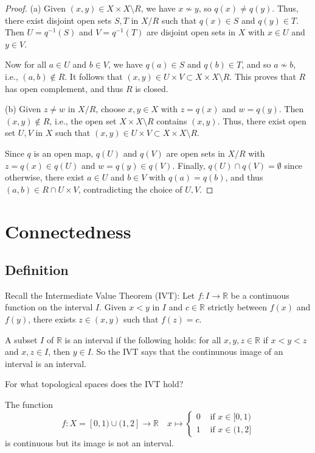 \documentclass[a4paper,11pt]{article}
\begin{document}
\begin{proof}
    (a) Given $(x, y) \in X \times X \setminus R$, we have $x \not\sim y$, so $q(x) \neq q(y)$. Thus, there exist disjoint open sets $S, T$ in $X / R$ such that $q(x) \in S$ and $q(y) \in T$. Then $U=q^{-1}(S)$ and $V=q^{-1}(T)$ are disjoint open sets in $X$ with $x \in U$ and $y \in V$. 
    
    Now for all $a \in U$ and $b \in V$, we have $q(a) \in S$ and $q(b) \in T$, and so $a \not\sim b$, i.e., $(a, b) \notin R$. It follows that $(x, y) \in U \times V \subset X \times X \setminus R$. This proves that $R$ has open complement, and thus $R$ is closed.

(b) Given $z \neq w$ in $X / R$, choose $x, y \in X$ with $z=q(x)$ and $w=q(y)$. Then $(x, y) \notin R$, i.e., the open set $X \times X \setminus R$ contains $(x, y)$. Thus, there exist open set $U, V$ in $X$ such that $(x, y) \in U \times V \subset X \times X \setminus R$. 

Since $q$ is an open map, $q(U)$ and $q(V)$ are open sets in $X / R$ with $z=q(x) \in q(U)$ and $w=q(y) \in q(V)$. Finally, $q(U) \cap q(V)=\emptyset$ since otherwise, there exist $a \in U$ and $b \in V$ with $q(a)=q(b)$, and thus $(a, b) \in R \cap U \times V$, contradicting the choice of $U, V$.
\end{proof}

\section{Connectedness}
\subsection{Definition}

Recall the Intermediate Value Theorem (IVT): Let $f: I \rightarrow \mathbb{R}$ be a continuous function on the interval $I$. Given $x<y$ in $I$ and $c \in \mathbb{R}$ strictly between $f(x)$ and $f(y)$, there exists $z \in(x, y)$ such that $f(z)=c$.

A subset $I$ of $\mathbb{R}$ is an interval if the following holds: for all $x, y, z \in \mathbb{R}$ if $x<y<z$ and $x, z \in I$, then $y \in I$. So the IVT says that the continunous image of an interval is an interval.

\begin{sque}
    For what topological spaces does the IVT hold?
\end{sque}

\begin{example}
    The function
    $$
    f: X=[0,1) \cup(1,2] \rightarrow \mathbb{R} \quad x \mapsto \begin{cases}0 & \text { if } x \in[0,1) \\ 1 & \text { if } x \in(1,2]\end{cases}
    $$
    is continuous but its image is not an interval.
\end{example}
\end{document}
